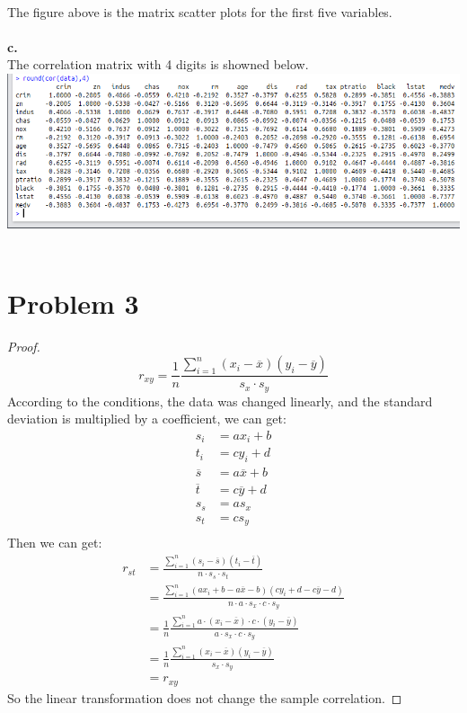 \documentclass{article}
\begin{document}
~\\
The figure above is the matrix scatter plots for the first five variables.\\
~\\
\textbf{c.}\\
The correlation matrix with 4 digits is showned below.\\
\includegraphics[width=6in]{corre.png}
~\\


\section{Problem 3}
\begin{proof}
\begin{equation*}
  r_{xy} = \frac{1}{n}\frac{\sum_{i=1}^n \left(x_i - \overline{x}\right)\left(y_i - \overline{y}\right)}{s_x \cdot s_y}
\end{equation*}
According to the conditions, the data was changed linearly, and the standard deviation is multiplied by a coefficient, we can get:
\begin{align*}
  s_i &= ax_i + b\\
  t_i &= cy_i + d\\
  \overline{s} &= a\overline{x} + b\\
  \overline{t} &= c\overline{y} + d\\
  s_s &= as_x\\
  s_t &= cs_y\\
\end{align*}
Then we can get:
\begin{align*}
  r_{st} &= \frac{\sum_{i=1}^n \left(s_i - \overline{s}\right)\left(t_i - \overline{t}\right)}{n \cdot s_s \cdot s_t}\\
  &= \frac{\sum_{i=1}^n \left(ax_i + b - a\overline{x} - b\right)\left(cy_i + d - c\overline{y} - d\right)}{n \cdot a \cdot s_x \cdot c \cdot s_y}\\
  &=\frac{1}{n}\frac{\sum_{i=1}^n a \cdot \left(x_i - \overline{x}\right) \cdot c \cdot \left(y_i - \overline{y}\right)}{a\cdot s_x \cdot c \cdot s_y}\\
  &=\frac{1}{n}\frac{\sum_{i=1}^n \left(x_i - \overline{x}\right)\left(y_i - \overline{y}\right)}{s_x \cdot s_y}\\
  &=r_{xy}
\end{align*}
So the linear transformation does not change the sample correlation.
\end{proof}
\end{document}

